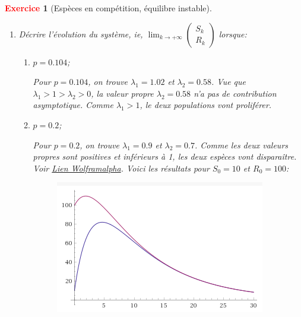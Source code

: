 \documentclass[11pt]{article}
\theoremstyle{mythmstyle}
\newtheorem{exo}{\textcolor{red}{\textbf{Exercice}}}
\newcommand{\R}{\mathbb{R}}
\begin{document}
\begin{exo}[Espèces en compétition, équilibre instable]
\begin{enumerate}
\begin{solution}
    $$\Delta=(-1.6)^2 - 4.(0.55+0.4p)=0.36 - 1.6p$$ 
    
    Donc pour avoir des valeurs propres réels il faut que 
    
    $$
    0.36-1.6p>0 \Leftrightarrow 1.6p<0.36 \Leftrightarrow p< 0.225
    $$
    Donc $\lambda_1= \frac{1.6+ \sqrt{0.36-1.6p}}{2}$ et $\lambda_2=\frac{1.6- \sqrt{0.36-1.6p}}{2}$.
\end{solution}
    \item Décrire l’évolution du système, ie, $\lim_{k\to+\infty} \begin{pmatrix}S_k\\R_k\end{pmatrix}$ lorsque:
\begin{enumerate}    
     \item $p=0.104$;
\begin{solution}
    Pour $p=0.104$, on trouve $\lambda_1= 1.02$ et $\lambda_2=0.58$. Vue que $\lambda_1>1>\lambda_2>0$,
    la valeur propre $\lambda_2=0.58$ n'a pas de contribution asymptotique. Comme $\lambda_1>1$, le deux populations vont proliférer.
\end{solution}
    \item $p=0.2$;
\begin{solution}
    Pour $p=0.2$, on trouve $\lambda_1= 0.9$ et $\lambda_2=0.7$. Comme les deux valeurs propres sont positives et inférieurs à 1, 
les deux espèces vont disparaître. Voir 
\href{https://www.wolframalpha.com/input/?i=u%28n%2B1%29%3D0.5*u%28n%29%2B0.4*v%28n%29%2C+v%28n%2B1%29%3D-0.2*u%28n%29%2B%281.1%29*v%28n%29}{Lien Wolframalpha}. 
Voici les résultats pour $S_0=10$ et $R_0=100$:

\begin{figure}[H]
\begin{center}
\includegraphics[scale=0.5]{ratsANDserpentsp02.png}
\end{center}
\end{figure}
        

\end{solution}
\end{enumerate}
\end{enumerate}
\end{exo}
\end{document}
